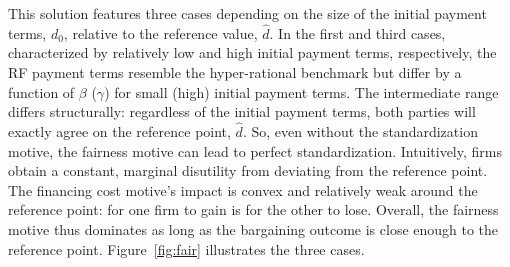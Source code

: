 \documentclass[a4paper,11pt]{article}
\newcommand{\dref}{\widehat d}
\renewcommand{\~}[1]{\tilde{#1}}
\renewcommand{\-}[1]{\overline{#1}}
\begin{document}
This solution features three cases depending on the size of the initial payment terms, $d_0$, relative to the reference value, $\dref$. In the first and third cases, characterized by relatively low and high initial payment terms, respectively, the RF payment terms resemble the hyper-rational benchmark but differ by a function of $\beta$ ($\gamma$) for small (high) initial payment terms. The intermediate range differs structurally: regardless of the initial payment terms, both parties will exactly agree on the reference point, $\dref$. So, even without the standardization motive, the fairness motive can lead to perfect standardization. Intuitively, firms obtain a constant, marginal disutility from deviating from the reference point. The financing cost motive's impact is convex and relatively weak around the reference point: for one firm to gain is for the other to lose. Overall, the fairness motive thus dominates as long as the bargaining outcome is close enough to the reference point. Figure~\ref{fig:fair} illustrates the three cases. %
\end{document}
